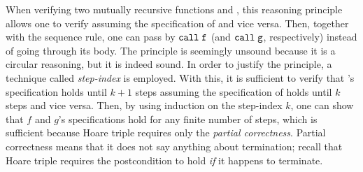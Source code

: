 \noindent When verifying two mutually recursive functions  and , this reasoning principle allows one to verify  assuming the specification of  and vice versa.
Then, together with the sequence rule, one can pass by $\texttt{call} \; \texttt{f}$ (and $\texttt{call} \; \texttt{g}$, respectively) instead of going through its body.
The principle is seemingly unsound because it is a circular reasoning, but %
it is indeed sound. %
In order to justify the principle, a technique called {\it step-index} is employed.
With this, it is sufficient to verify that 's specification holds until $k+1$ steps assuming the specification of  holds until $k$ steps and vice versa.
Then, by using induction on the step-index $k$, one can show that $f$ and $g$'s specifications hold for any finite number of steps, which is sufficient because Hoare triple requires only the {\it partial correctness}.
Partial correctness means that it does not say anything about termination; recall that Hoare triple requires the postcondition to hold {\it if} it happens to terminate.
